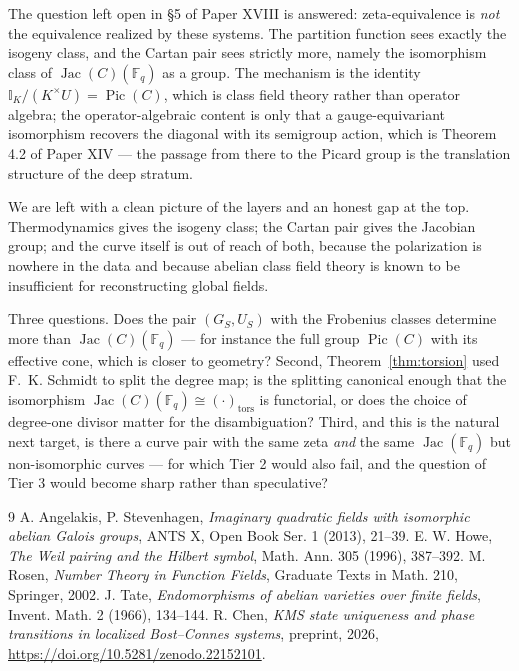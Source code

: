 \documentclass[11pt]{amsart}
\numberwithin{equation}{section}
\theoremstyle{definition}
\theoremstyle{remark}
\newcommand{\F}{\mathbb{F}}
\newcommand{\Idl}{\mathbb{I}}
\newcommand{\Pic}{\operatorname{Pic}}
\newcommand{\Jac}{\operatorname{Jac}}
\newcommand{\tors}{\mathrm{tors}}
\begin{document}
The question left open in \S5 of Paper XVIII is answered: zeta-equivalence is
\emph{not} the equivalence realized by these systems. The partition function sees exactly the
isogeny class, and the Cartan pair sees strictly more, namely the isomorphism class of
$\Jac(C)(\F_q)$ as a group. The mechanism is the identity
$\Idl_K/(K^\times U)=\Pic(C)$, which is class field theory rather than operator algebra; the
operator-algebraic content is only that a gauge-equivariant isomorphism recovers the
diagonal with its semigroup action, which is Theorem 4.2 of Paper XIV --- the passage from
there to the Picard group is the translation structure of the deep stratum.

We are left with a clean picture of the layers and an honest gap at the top. Thermodynamics
gives the isogeny class; the Cartan pair gives the Jacobian group; and the curve itself is
out of reach of both, because the polarization is nowhere in the data and because abelian
class field theory is known to be insufficient for reconstructing global fields.

Three questions. Does the pair $(G_S,U_S)$ with the Frobenius classes determine more than
$\Jac(C)(\F_q)$ --- for instance the full group $\Pic(C)$ with its effective cone, which is
closer to geometry? Second, Theorem~\ref{thm:torsion} used F.~K. Schmidt to split the degree
map; is the splitting canonical enough that the isomorphism $\Jac(C)(\F_q)\cong(\cdot)_\tors$
is functorial, or does the choice of degree-one divisor matter for the disambiguation?
Third, and this is the natural next target, is there a curve pair with the same zeta
\emph{and} the same $\Jac(\F_q)$ but non-isomorphic curves --- for which Tier 2 would also
fail, and the question of Tier 3 would become sharp rather than speculative?

\begin{thebibliography}{9}
 A. Angelakis, P. Stevenhagen, \emph{Imaginary quadratic fields with isomorphic abelian Galois groups}, ANTS X, Open Book Ser. 1 (2013), 21--39.
 E. W. Howe, \emph{The Weil pairing and the Hilbert symbol}, Math. Ann. 305 (1996), 387--392.
 M. Rosen, \emph{Number Theory in Function Fields}, Graduate Texts in Math. 210, Springer, 2002.
 J. Tate, \emph{Endomorphisms of abelian varieties over finite fields}, Invent. Math. 2 (1966), 134--144.
 R. Chen, \emph{KMS state uniqueness and phase transitions in localized Bost--Connes systems}, preprint, 2026, \newline\url{https://doi.org/10.5281/zenodo.22152101}.
\end{thebibliography}
\end{document}
